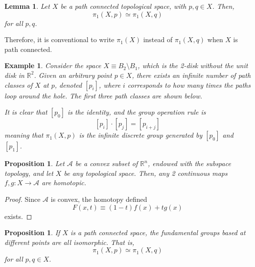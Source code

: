 \documentclass{article}
\newtheorem{proposition}[theorem]{Proposition}
\newtheorem{lemma}[theorem]{Lemma}
\newtheorem{example}{Example}[section]
\theoremstyle{remark}
\theoremstyle{definition}
\begin{document}
  \begin{lemma}
  Let $X$ be a path connected topological space, with $p, q \in X$. Then, 
  \[\pi_1 (X, p) \simeq \pi_1 (X, q)\]
  for all $p, q$. 
  \end{lemma}

  Therefore, it is conventional to write $\pi_1 (X)$ instead of $\pi_1 (X, q)$ when $X$ is path connected. 

  \begin{example}
  Consider the space $X \equiv B_2 \setminus B_1$, which is the 2-disk without the unit disk in $\mathbb{R}^2$. Given an arbitrary point $p \in X$, there exists an infinite number of path classes of $X$ at $p$, denoted $[p_i]$, where $i$ corresponds to how many times the paths loop around the hole. The first three path classes are shown below. 
  \begin{center}
  \end{center}
  It is clear that $[p_0]$ is the identity, and the group operation rule is
  \[[p_i] \cdot [p_j] = [p_{i+j}]\]
  meaning that $\pi_1(X, p)$ is the infinite discrete group generated by $[p_0]$ and $[p_1]$. 
  \end{example}

  \begin{proposition}
  Let $\mathcal{A}$ be a convex subset of $\mathbb{R}^n$, endowed with the subspace topology, and let $X$ be any topological space. Then, any 2 continuous maps $f,g: X \longrightarrow \mathcal{A}$ are homotopic. 
  \end{proposition}
  \begin{proof}
  Since $\mathcal{A}$ is convex, the homotopy defined 
  \[F(x, t) \equiv (1-t) f(x) + t g(x)\]
  exists. 
  \end{proof}

  \begin{proposition}
  If $X$ is a path connected space, the fundamental groups based at different points are all isomorphic. That is, 
  \[\pi_1 (X, p) \simeq \pi_1 (X, q)\]
  for all $p, q \in X$. 
  \end{proposition}
\end{document}
